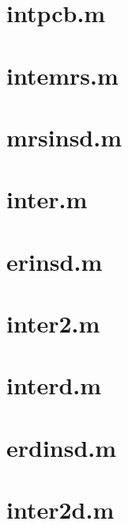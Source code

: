 \section{intpcb.m}
\label{sec:app10}


\section{intemrs.m}
\label{sec:app11}


\section{mrsinsd.m}
\label{sec:app11}


\section{inter.m}
\label{sec:app12}


\section{erinsd.m}
\label{sec:app14}



\section{inter2.m}
\label{sec:app13}


\section{interd.m}
\label{sec:app14}


\section{erdinsd.m}
\label{sec:app14}


\section{inter2d.m}
\label{sec:app15}


